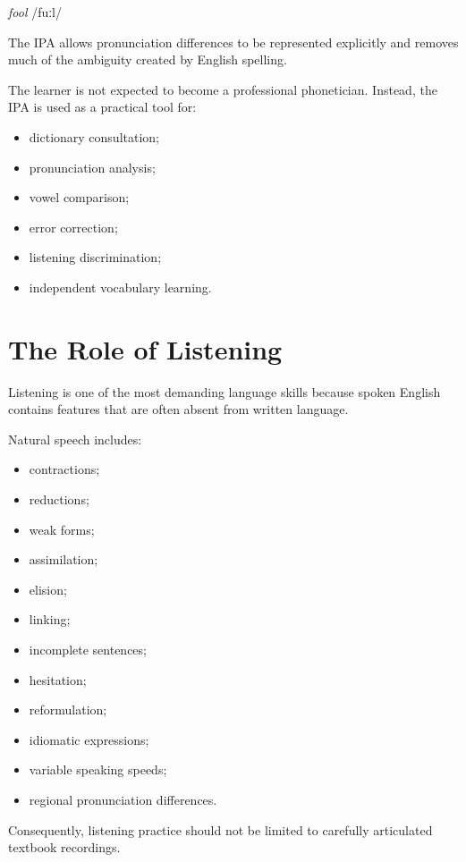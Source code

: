 \begin{center}
\textit{fool} /fuːl/
\end{center}

The IPA allows pronunciation differences to be represented explicitly and removes much of the ambiguity created by English spelling.

The learner is not expected to become a professional phonetician. Instead, the IPA is used as a practical tool for:

\begin{itemize}
    \item dictionary consultation;
    \item pronunciation analysis;
    \item vowel comparison;
    \item error correction;
    \item listening discrimination;
    \item independent vocabulary learning.
\end{itemize}

\section*{The Role of Listening}

Listening is one of the most demanding language skills because spoken English contains features that are often absent from written language.

Natural speech includes:

\begin{itemize}
    \item contractions;
    \item reductions;
    \item weak forms;
    \item assimilation;
    \item elision;
    \item linking;
    \item incomplete sentences;
    \item hesitation;
    \item reformulation;
    \item idiomatic expressions;
    \item variable speaking speeds;
    \item regional pronunciation differences.
\end{itemize}

Consequently, listening practice should not be limited to carefully articulated textbook recordings.

